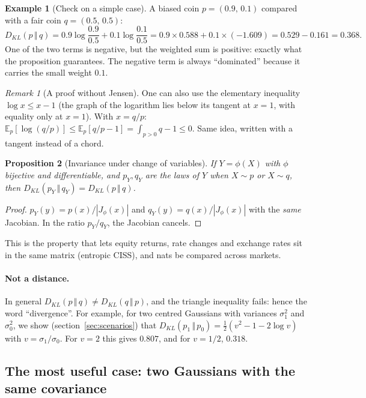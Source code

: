 \documentclass[11pt]{article}
\theoremstyle{plain}
\newtheorem{proposition}{Proposition}[section]
\theoremstyle{definition}
\newtheorem{exemple}[proposition]{Example}
\theoremstyle{remark}
\newtheorem*{remarque}{Remark}
\newcommand{\E}{\mathbb{E}}
\newcommand{\KL}[2]{D_{KL}\!\left(#1\,\Vert\,#2\right)}
\begin{document}
\begin{exemple}[Check on a simple case]
A biased coin $p=(0.9,\,0.1)$ compared with a fair coin $q=(0.5,\,0.5)$:
\[
\KL{p}{q}=0.9\log\frac{0.9}{0.5}+0.1\log\frac{0.1}{0.5}
=0.9\times0.588+0.1\times(-1.609)=0.529-0.161=0.368 .
\]
One of the two terms is negative, but the weighted sum is positive: exactly
what the proposition guarantees. The negative term is always ``dominated''
because it carries the small weight $0.1$.
\end{exemple}

\begin{remarque}[A proof without Jensen]
One can also use the elementary inequality $\log x\le x-1$ (the graph of the
logarithm lies below its tangent at $x=1$, with equality only at $x=1$). With
$x=q/p$: $\E_p[\log(q/p)]\le\E_p[q/p-1]=\int_{p>0}q-1\le0$. Same idea,
written with a tangent instead of a chord.
\end{remarque}

\begin{proposition}[Invariance under change of variables]
\label{prop:invariance}
If $Y=\phi(X)$ with $\phi$ bijective and differentiable, and $p_Y,q_Y$ are the
laws of $Y$ when $X\sim p$ or $X\sim q$, then $\KL{p_Y}{q_Y}=\KL{p}{q}$.
\end{proposition}

\begin{proof}
$p_Y(y)=p(x)/|J_\phi(x)|$ and $q_Y(y)=q(x)/|J_\phi(x)|$ with the \emph{same}
Jacobian. In the ratio $p_Y/q_Y$, the Jacobian cancels.
\end{proof}

\begin{papier}
This is the property that lets equity returns, rate changes and exchange rates
sit in the same matrix (entropic CISS), and nats be compared across markets.
\end{papier}

\paragraph{Not a distance.} In general $\KL{p}{q}\neq\KL{q}{p}$, and the
triangle inequality fails: hence the word ``divergence''. For example, for two
centred Gaussians with variances $\sigma_1^2$ and $\sigma_0^2$, we show
(section~\ref{sec:scenarios}) that $\KL{p_1}{p_0}=\tfrac12(v^2-1-2\log v)$ with
$v=\sigma_1/\sigma_0$. For $v=2$ this gives $0.807$, and for $v=1/2$, $0.318$.

\subsection{The most useful case: two Gaussians with the same covariance}
\end{document}
